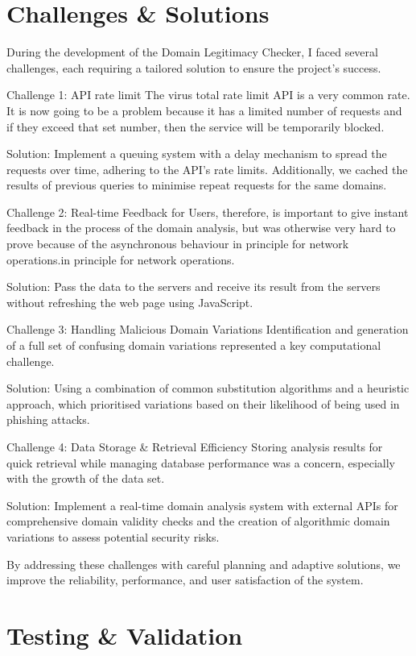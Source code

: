 \section{Challenges \& Solutions}

During the development of the Domain Legitimacy Checker, I faced several challenges, each requiring a tailored solution to ensure the project's success.

Challenge 1: API rate limit
The virus total rate limit API is a very common rate. It is now going to be a problem because it has a limited number of requests and if they exceed that set number, then the service will be temporarily blocked.

Solution: Implement a queuing system with a delay mechanism to spread the requests over time, adhering to the API's rate limits. Additionally, we cached the results of previous queries to minimise repeat requests for the same domains.

Challenge 2: Real-time Feedback for Users, therefore, is important to give instant feedback in the process of the domain analysis, but was otherwise very hard to prove because of the asynchronous behaviour in principle for network operations.in principle for network operations.

Solution: Pass the data to the servers and receive its result from the servers without refreshing the web page using JavaScript. 

Challenge 3: Handling Malicious Domain Variations
Identification and generation of a full set of confusing domain variations represented a key computational challenge.

Solution: Using a combination of common substitution algorithms and a heuristic approach, which prioritised variations based on their likelihood of being used in phishing attacks. 

Challenge 4: Data Storage \& Retrieval Efficiency
Storing analysis results for quick retrieval while managing database performance was a concern, especially with the growth of the data set.

Solution: Implement a real-time domain analysis system with external APIs for comprehensive domain validity checks and the creation of algorithmic domain variations to assess potential security risks. 
 
By addressing these challenges with careful planning and adaptive solutions, we improve the reliability, performance, and user satisfaction of the system.

\section{Testing \& Validation}

